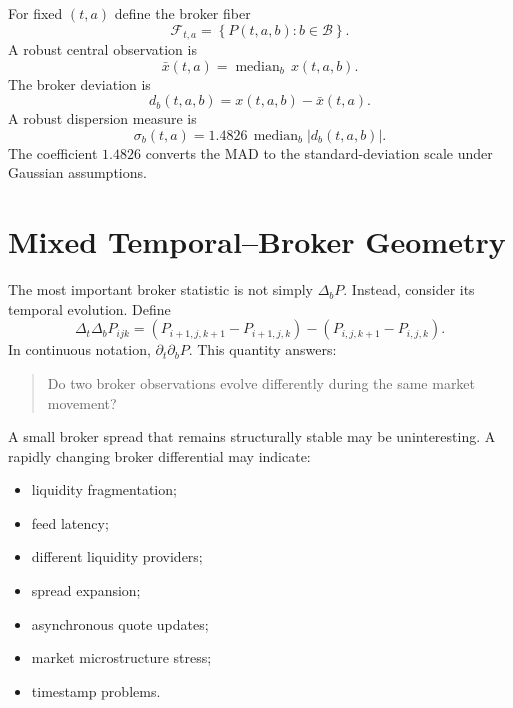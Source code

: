 \documentclass[11pt,a4paper]{article}
\numberwithin{equation}{section}
\newcommand{\med}{\operatorname{median}}
\newcommand{\abs}[1]{\left|#1\right|}
\newcommand{\Bset}{\mathcal{B}}
\begin{document}
For fixed $(t,a)$ define the broker fiber
\begin{equation}
\mathcal{F}_{t,a}=\left\{P(t,a,b):b\in\Bset\right\}.
\end{equation}
A robust central observation is
\begin{equation}
\bar{x}(t,a)=\med_b\,x(t,a,b).
\label{eq:broker_median}
\end{equation}
The broker deviation is
\begin{equation}
d_b(t,a,b)=x(t,a,b)-\bar{x}(t,a).
\label{eq:broker_deviation}
\end{equation}
A robust dispersion measure is
\begin{equation}
\sigma_b(t,a)=1.4826\,\med_b\abs{d_b(t,a,b)}.
\label{eq:broker_mad}
\end{equation}
The coefficient $1.4826$ converts the MAD to the standard-deviation
scale under Gaussian assumptions.

\section{Mixed Temporal--Broker Geometry}

The most important broker statistic is not simply $\Delta_bP$.
Instead, consider its temporal evolution. Define
\begin{equation}
\Delta_t\Delta_bP_{ijk}
=\left(P_{i+1,j,k+1}-P_{i+1,j,k}\right)
-\left(P_{i,j,k+1}-P_{i,j,k}\right).
\label{eq:dt_db}
\end{equation}
In continuous notation, $\partial_t\partial_bP$. This quantity
answers:
\begin{quote}
Do two broker observations evolve differently during the same market
movement?
\end{quote}

A small broker spread that remains structurally stable may be
uninteresting. A rapidly changing broker differential may indicate:
\begin{itemize}
\item liquidity fragmentation;
\item feed latency;
\item different liquidity providers;
\item spread expansion;
\item asynchronous quote updates;
\item market microstructure stress;
\item timestamp problems.
\end{itemize}
\end{document}
